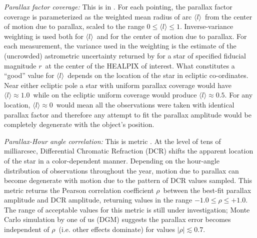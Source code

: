 {\it Parallax factor coverage:} This is  in \MAF. For
  each pointing, the parallax factor coverage is parameterized as the
  weighted mean radius of arc $\langle l \rangle$~from the center of
  motion due to parallax, scaled to the range $0 \le \langle l \rangle
  \le 1$. Inverse-variance weighting is used both for $\langle l \rangle$~and for the center of motion due to parallax.
For each measurement,
  the variance used in the weighting is the estimate of the
  (uncrowded) astrometric uncertainty returned by \OpSim for a star of
  specified fiducial magnitude $r$~at the center of the HEALPIX of
  interest. What constitutes a ``good'' value for $\langle l \rangle$~depends on the location
  of the star in ecliptic co-ordinates. Near either ecliptic pole a
  star with uniform parallax coverage would have $\langle l \rangle
  \approx 1.0$~while on the ecliptic uniform coverage would produce
  $\langle l \rangle \approx 0.5$. For any location, $\langle l
  \rangle \approx 0$~would mean all the observations were taken with
  identical parallax factor and therefore any attempt to fit the
  parallax amplitude would be completely degenerate with the object's
  position.

{\it Parallax-Hour angle correlation:} This is \MAF metric . At the level of tens
  of milliarcsec, Differential Chromatic Refraction (DCR) shifts the
  apparent location of the star in a color-dependent manner. Depending
  on the hour-angle distribution of observations throughout the year,
  motion due to parallax can become degenerate with motion due to the
  pattern of DCR values sampled. This metric returns the Pearson
  correlation coefficient $\rho$~between the best-fit parallax
  amplitude and DCR amplitude, returning values in the range $-1.0 \le
  \rho \le +1.0$. The range of acceptable values for this metric is
  still under investigation; Monte Carlo simulation by one of us (DGM)
  suggests the parallax error becomes independent of
  $\rho$~(i.e. other effects dominate) for values $|\rho| \lesssim
  0.7$.



